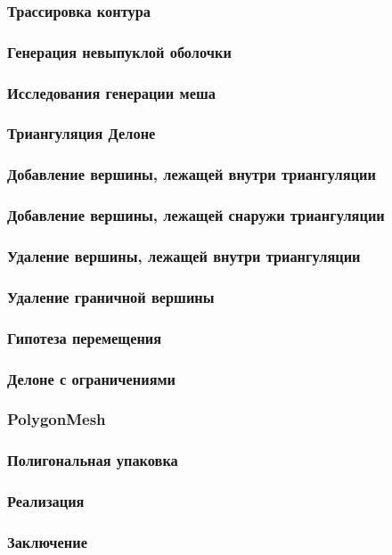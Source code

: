 \documentclass[10pt, unicode]{beamer}
\begin{document}
    \begin{frame}
        \frametitle{Трассировка контура}
    \end{frame}
    \begin{frame}
        \frametitle{Генерация невыпуклой оболочки}
    \end{frame}
    \begin{frame}
        \frametitle{Исследования генерации меша}
    \end{frame}
    \begin{frame}
        \frametitle{Триангуляция Делоне}
    \end{frame}
    \begin{frame}
        \frametitle{Добавление вершины, лежащей внутри триангуляции}
    \end{frame}
    \begin{frame}
        \frametitle{Добавление вершины, лежащей снаружи триангуляции}
    \end{frame}
    \begin{frame}
        \frametitle{Удаление вершины, лежащей внутри триангуляции}
    \end{frame}
    \begin{frame}
        \frametitle{Удаление граничной вершины}
    \end{frame}
    \begin{frame}
        \frametitle{Гипотеза перемещения}
    \end{frame}
    \begin{frame}
        \frametitle{Делоне с ограничениями}
    \end{frame}
    \begin{frame}
        \frametitle{PolygonMesh}
    \end{frame}
    \begin{frame}
        \frametitle{Полигональная упаковка}
    \end{frame}
    \begin{frame}
        \frametitle{Реализация}
    \end{frame}
    \begin{frame}
        \frametitle{Заключение}
    \end{frame}
\end{document}
